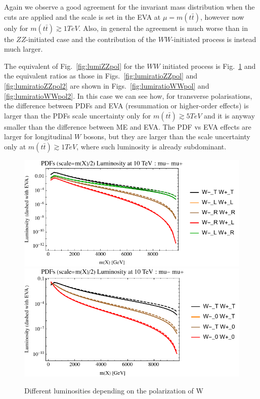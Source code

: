 \documentclass[a4paper,11pt]{article}
\begin{document}
Again we observe a good agreement for the invariant mass distribution when the cuts are applied and the scale is set in the EVA at $\mu=m(t \bar t)$, however now only for $m(t \bar t) \gtrsim 1 TeV$. Also, in general the agreement is much worse than in the $ZZ$-initiated case and the contribution of the $WW$-initiated process is instead much larger. 

The equivalent of Fig.~\ref{fig:lumiZZpol} for the $WW$ initiated process is Fig.~\ref{fig:lumiWWpol} and the equivalent ratios as those in Figs.~\ref{fig:lumiratioZZpol} and \ref{fig:lumiratioZZpol2} are shown in Figs.~\ref{fig:lumiratioWWpol} and \ref{fig:lumiratioWWpol2}. In this case we can see how, for transverse polarisations, the difference between PDFs and EVA (resummation or higher-order effects) is larger than the PDFs scale uncertainty only for  $m(t \bar t) \gtrsim 5 TeV$ and it is anyway smaller than the difference between ME and EVA. The PDF vs EVA effects are larger for longitudinal $W$ bosons, but they are larger than the scale uncertainty only at  $m(t \bar t) \gtrsim 1 TeV$, where such luminosity is already subdominant.  


\begin{figure}[!t]
\includegraphics[width=0.46\linewidth]{Notebooks/PlotLumi/10TeV/lumis/plotWWpolRandL.pdf}
\includegraphics[width=0.46\linewidth]{Notebooks/PlotLumi/10TeV/lumis/plotWWpolTand0.pdf}
\caption{Different luminosities depending on the polarization of W \label{fig:lumiWWpol}}
\end{figure}
 
\end{document}
